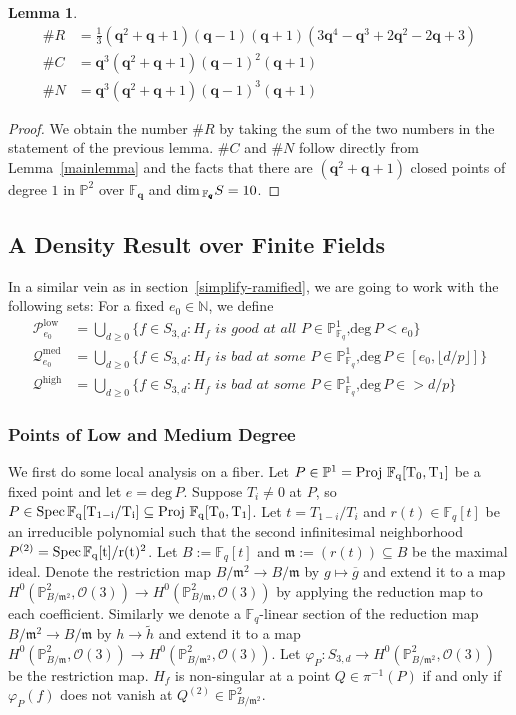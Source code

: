 \documentclass[12pt]{article}
\theoremstyle{plain}
\newtheorem{lemma}[equation]{Lemma}
\theoremstyle{definition}
\newcommand{\fm}{\mathfrak{m}}
\newcommand{\IN}{\mathbb{N}}
\newcommand{\IF}{\mathbb{F}}
\newcommand{\IP}{\mathbb{P}}
\newcommand{\sO}{\mathcal{O}}
\newcommand{\sP}{\mathcal{P}}
\newcommand{\sQ}{\mathcal{Q}}
\renewcommand{\deg}{\mathrm{deg}\,}
\newcommand{\Spec}{\rm Spec\,}
\newcommand{\Proj}{\rm Proj\,}
\renewcommand\dim{{\rm dim\,}}
\newcommand\union{\bigcup}
\newcommand{\<}{\langle}
\renewcommand{\>}{\rangle}
\def\wt{\widetilde}
\begin{document}
\begin{lemma}
\begin{align*}
\# R &= \frac{1}{3}(\pmb{q}^2 + \pmb{q} + 1)(\pmb{q} - 1) (\pmb{q} + 1)(3\pmb{q}^4 - \pmb{q}^3 + 2 \pmb{q}^2 - 2\pmb{q} + 3)\\
\# C &= \pmb{q}^3 (\pmb{q}^2 + \pmb{q} + 1) (\pmb{q} - 1)^2 (\pmb{q} + 1) \\
\# N &= \pmb{q}^3 (\pmb{q}^2 + \pmb{q} + 1) (\pmb{q} - 1)^3 (\pmb{q} + 1)
\end{align*}
\end{lemma}
\begin{proof}
We obtain the number $\# R$ by taking the sum of the two numbers in the statement of the previous lemma.
$\# C$ and $\# N$ follow directly from Lemma~\ref{mainlemma} and the facts that there are $(\pmb{q}^2 + \pmb{q} + 1)$ closed points of degree $1$ in $\IP^2$ over $\IF_{\pmb{q}}$ and $\dim_{\IF_{\pmb{q}}} S = 10$. 
\end{proof}


\subsection{A Density Result over Finite Fields}
In a similar vein as in section~\ref{simplify-ramified}, we are going to work with the following sets:
For a fixed $e_0 \in \IN$, we define 
\begin{align*}
\sP_{e_0}^{\mathrm{low}} &= \union_{d \ge 0} \{ f \in S_{3, d} : H_f \textit{ is good at all $P \in \IP^1_{\IF_q}$,}\deg P < e_0\}\\
\sQ_{e_0}^{\mathrm{med}} &= \union_{d \ge 0} \{f \in S_{3, d} : H_f \textit{ is bad at some $P \in \IP^1_{\IF_q}$,}\deg P \in [e_0, \lfloor d/p \rfloor]\}\\
\sQ^{\mathrm{high}} &= \union_{d \ge 0} \{f \in S_{3, d} : H_f \textit{ is bad at some $P \in \IP^1_{\IF_q}$,}\deg P \in > d/p\}
\end{align*}
\subsubsection{Points of Low and Medium Degree}
 

We first do some local analysis on a fiber. Let $P \in \IP^1 = \Proj \, \IF_q[T_0, T_1]$ be a fixed point and let $e = \deg P$. Suppose $T_i \neq 0$ at $P$, so $P \in \Spec \IF_q[T_{1-i}/T_i] \subseteq \Proj \, \IF_q[T_0, T_1]$. Let $t = T_{1-i}/T_i$ and $r(t) \in \IF_q[t]$ be an irreducible polynomial such that the second infinitesimal neighborhood $P^{(2)} = \Spec \IF_q[t]/r(t)^2$. Let $B := \IF_q[t]$ and $\fm := (r(t)) \subseteq B$ be the maximal ideal. Denote the restriction map $B/\fm^2 \to B/\fm$ by $g \mapsto \overline{g}$ and extend it to a map $H^0(\IP^2_{B/\fm^2}, \sO(3)) \to H^0(\IP^2_{B/\fm}, \sO(3))$ by applying the reduction map to each coefficient. Similarly we denote a $\IF_q$-linear section of the reduction map $B/\fm^2 \to B/\fm$ by $h \to \wt{h}$ and extend it to a map $H^0(\IP^2_{B/\fm}, \sO(3)) \to H^0(\IP^2_{B/\fm^2}, \sO(3))$. Let $\varphi_P : S_{3, d} \to H^0(\IP^2_{B/\fm^2}, \sO(3))$ be the restriction map. $H_f$ is non-singular at a point $Q \in \pi^{-1}(P)$ if and only if $\varphi_P(f)$ does not vanish at $Q^{(2)} \in \IP^2_{B/\fm^2}$. 
\end{document}
